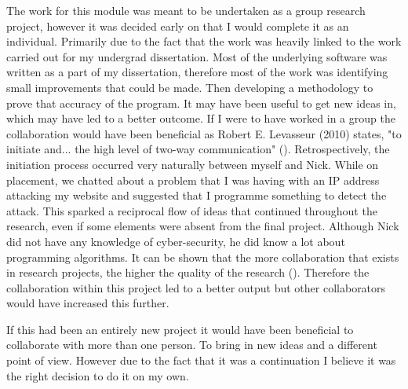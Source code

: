 The work for this module was meant to be undertaken as a group research project, however it was decided early on that I would complete it as an individual. Primarily due to the fact that the work was heavily linked to the work carried out for my undergrad dissertation. Most of the underlying software was written as a part of my dissertation, therefore most of the work was identifying small improvements that could be made. Then developing a methodology to prove that accuracy of the program. It may have been useful to get new ideas in, which may have led to a better outcome. If I were to have worked in a group the collaboration would have been beneficial as Robert E. Levasseur (2010) states, "to initiate and... the high level of two-way communication" (\cite{levasseur2010people}). Retrospectively, the initiation process occurred very naturally between myself and Nick. While on placement, we chatted about a problem that I was having with an IP address attacking my website and suggested that I programme something to detect the attack. This sparked a reciprocal flow of ideas that continued throughout the research, even if some elements were absent from the final project. Although Nick did not have any knowledge of cyber-security, he did know a lot about programming algorithms. It can be shown that the more collaboration that exists in research projects, the higher the quality of the research (\cite{figg2006scientific}). Therefore the collaboration within this project led to a better output but other collaborators would have increased this further. 




If this had been an entirely new project it would have been beneficial to collaborate with more than one person. To bring in new ideas and a different point of view. However due to the fact that it was a continuation I believe it was the right decision to do it on my own.  